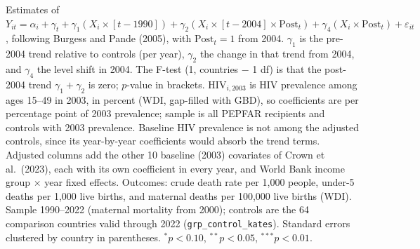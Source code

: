 \begin{table}[htbp]
\begin{minipage}{\textwidth}\footnotesize Estimates of $Y_{it} = \alpha_i + \gamma_t + \gamma_1 (X_i \times [t-1990]) + \gamma_2 (X_i \times [t-2004] \times \mathrm{Post}_t) + \gamma_4 (X_i \times \mathrm{Post}_t) + \varepsilon_{it}$, following Burgess and Pande (2005), with $\mathrm{Post}_t = 1$ from 2004. $\gamma_1$ is the pre-2004 trend relative to controls (per year), $\gamma_2$ the change in that trend from 2004, and $\gamma_4$ the level shift in 2004. The F-test (1, countries $-$ 1 df) is that the post-2004 trend $\gamma_1 + \gamma_2$ is zero; $p$-value in brackets. $\mathrm{HIV}_{i,2003}$ is HIV prevalence among ages 15--49 in 2003, in percent (WDI, gap-filled with GBD), so coefficients are per percentage point of 2003 prevalence; sample is all PEPFAR recipients and controls with 2003 prevalence. Baseline HIV prevalence is not among the adjusted controls, since its year-by-year coefficients would absorb the trend terms. Adjusted columns add the other 10 baseline (2003) covariates of Crown et al.\ (2023), each with its own coefficient in every year, and World Bank income group $\times$ year fixed effects. Outcomes: crude death rate per 1,000 people, under-5 deaths per 1,000 live births, and maternal deaths per 100,000 live births (WDI). Sample 1990--2022 (maternal mortality from 2000); controls are the 64 comparison countries valid through 2022 (\texttt{grp\_control\_kates}). Standard errors clustered by country in parentheses. $^{*}p<0.10$, $^{**}p<0.05$, $^{***}p<0.01$.\end{minipage}
\end{table}
